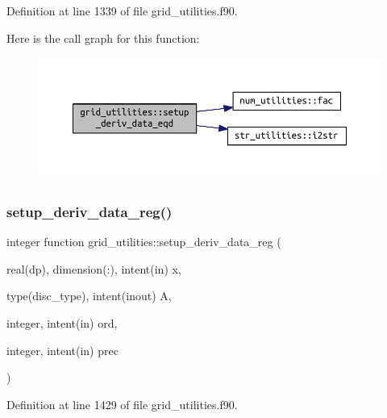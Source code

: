 Definition at line 1339 of file grid\+\_\+utilities.\+f90.

Here is the call graph for this function\+:
\nopagebreak
\begin{figure}[H]
\begin{center}
\leavevmode
\includegraphics[width=350pt]{namespacegrid__utilities_a32f5edd35f6976236b9848f56f951c83_cgraph}
\end{center}
\end{figure}
\mbox{\label{namespacegrid__utilities_a383fb7484b5a315a3b8019d388f88617}} 
\subsubsection{\texorpdfstring{setup\+\_\+deriv\+\_\+data\+\_\+reg()}{setup\_deriv\_data\_reg()}}
{\footnotesize\ttfamily integer function grid\+\_\+utilities\+::setup\+\_\+deriv\+\_\+data\+\_\+reg (\begin{DoxyParamCaption}\item[{real(dp), dimension(\+:), intent(in)}]{x,  }\item[{type(disc\+\_\+type), intent(inout)}]{A,  }\item[{integer, intent(in)}]{ord,  }\item[{integer, intent(in)}]{prec }\end{DoxyParamCaption})}



Definition at line 1429 of file grid\+\_\+utilities.\+f90.

